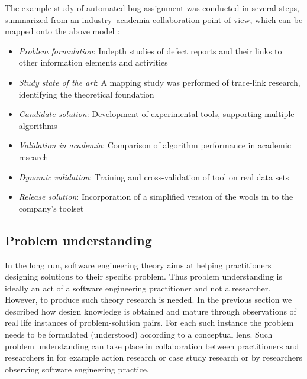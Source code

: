 \documentclass[graybox]{svmult}
\begin{document}
The example study of automated bug assignment was conducted in several steps, summarized from an industry--academia collaboration point of view, which can be mapped onto the above model \cite{CarverIEEESW2018}:
\begin{itemize}
\item \emph{Problem formulation}: Indepth studies of defect reports and their links to other information elements and activities
\item \emph{Study state of the art}: A mapping study was performed of trace-link research, identifying the theoretical foundation \cite{Borg2013EMSE}
\item \emph{Candidate solution}: Development of experimental tools, supporting multiple algorithms
\item \emph{Validation in academia}: Comparison of algorithm performance in academic research \cite{BorgESEM13}
\item \emph{Dynamic validation}: Training and cross-validation of tool on real data sets \cite{JonssonBug15}
\item \emph{Release solution}: Incorporation of a simplified version of the wools in to the company's toolset
\end{itemize} 

\subsection{Problem understanding}




In the long run, software engineering theory aims at helping practitioners designing solutions to their specific problem. Thus problem understanding is ideally an act of a software engineering practitioner and not a researcher. However, to produce such theory research is needed. In the previous section we described how design knowledge is obtained and mature through observations of real life instances of problem-solution pairs. For each such instance the problem needs to be formulated (understood) according to a conceptual lens. Such problem understanding can take place in collaboration between practitioners and researchers in for example action research or case study research or by researchers observing software engineering practice.
\end{document}
